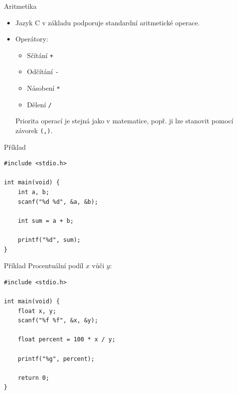 \documentclass[14pt,aspectratio=169]{beamer}
\begin{document}
    \begin{frame}[t]{Aritmetika}
        \begin{itemize}
            \item Jazyk C v základu podporuje standardní aritmetické operace.
            \item Operátory:
            \begin{itemize}
                \item Sčítání \texttt{+}
                \item Odčítání \texttt{-}
                \item Násobení \texttt{*}
                \item Dělení \texttt{/}
            \end{itemize}
            Priorita operací je stejná jako v matematice, popř. ji lze stanovit pomocí závorek \texttt{(,)}. 
        \end{itemize}
    \end{frame}

    \begin{frame}[t,fragile]{Příklad}
        \begin{lstlisting}
#include <stdio.h>

int main(void) {
    int a, b;
    scanf("%d %d", &a, &b);

    int sum = a + b;

    printf("%d", sum);
}
        \end{lstlisting}
    \end{frame}

    \begin{frame}[t,fragile]{Příklad}
        Procentuální podíl $x$ vůči $y$:
        \begin{lstlisting}
#include <stdio.h>

int main(void) {
    float x, y;
    scanf("%f %f", &x, &y);
    
    float percent = 100 * x / y;
    
    printf("%g", percent);

    return 0;
}
        \end{lstlisting}
    \end{frame}
\end{document}
